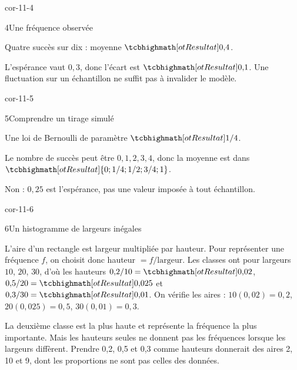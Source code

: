 \begin{blocLivre}{cor-11-4}
\begin{corrige}{4}{Une fréquence observée}
\begin{questions}
\item Quatre succès sur dix : moyenne $\res{0{,}4}$.
\item L’espérance vaut $0{,}3$, donc l’écart est $\res{0{,}1}$. Une fluctuation sur un échantillon ne suffit pas à invalider le modèle.
\end{questions}
\end{corrige}
\end{blocLivre}
\begin{blocLivre}{cor-11-5}
\begin{corrige}{5}{Comprendre un tirage simulé}
\begin{questions}
\item Une loi de Bernoulli de paramètre $\res{1/4}$.
\item Le nombre de succès peut être $0,1,2,3,4$, donc la moyenne est dans $\res{\{0;1/4;1/2;3/4;1\}}$.
\item Non : $0{,}25$ est l’espérance, pas une valeur imposée à tout échantillon.
\end{questions}
\end{corrige}
\end{blocLivre}
\begin{blocLivre}{cor-11-6}
\begin{corrige}{6}{Un histogramme de largeurs inégales}
\begin{questions}
\item L’aire d’un rectangle est largeur multipliée par hauteur.
Pour représenter une fréquence $f$, on choisit donc hauteur $=f/\text{largeur}$.
Les classes ont pour largeurs $10$, $20$, $30$, d’où les hauteurs
$0{,}2/10=\res{0{,}02}$, $0{,}5/20=\res{0{,}025}$ et $0{,}3/30=\res{0{,}01}$.
On vérifie les aires : $10(0{,}02)=0{,}2$, $20(0{,}025)=0{,}5$, $30(0{,}01)=0{,}3$.
\item La deuxième classe est la plus haute et représente la fréquence la plus importante.
Mais les hauteurs seules ne donnent pas les fréquences lorsque les largeurs diffèrent.
Prendre 0,2, 0,5 et 0,3 comme hauteurs donnerait des aires 2, 10 et 9, dont les proportions ne sont pas celles des données.
\end{questions}

\label{figlivre-r11-06-histogramme-cor}

\end{corrige}
\end{blocLivre}
